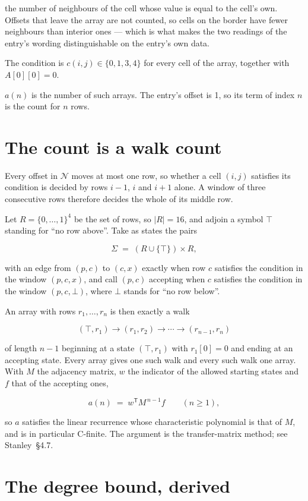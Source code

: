 \documentclass[11pt]{article}
\theoremstyle{definition}
\begin{document}
the number of neighbours of the cell whose value is equal to the cell's own. Offsets that leave the array are not counted, so cells on the border have fewer neighbours than interior ones --- which is what makes the two readings of the entry's wording distinguishable on the entry's own data.

The condition is $c(i,j) \in \{0, 1, 3, 4\}$ for every cell of the array, together with $A[0][0]=0$.

$a(n)$ is the number of such arrays. The entry's offset is 1, so its term of index $n$ is the count for $n$ rows.

\section{The count is a walk count}

Every offset in $\mathcal{N}$ moves at most one row, so whether a cell $(i,j)$ satisfies its condition is decided by rows $i-1$, $i$ and $i+1$ alone. A window of three consecutive rows therefore decides the whole of its middle row.

Let $R = \{0,\dots,1\}^{4}$ be the set of rows, so $|R| = 16$, and adjoin a symbol $\top$ standing for ``no row above''. Take as states the pairs

\[\Sigma \;=\; (R \cup \{\top\}) \times R,\]

with an edge from $(p,c)$ to $(c,x)$ exactly when row $c$ satisfies the condition in the window $(p,c,x)$, and call $(p,c)$ accepting when $c$ satisfies the condition in the window $(p,c,\bot)$, where $\bot$ stands for ``no row below''.

An array with rows $r_1,\dots,r_n$ is then exactly a walk

\[(\top,r_1) \to (r_1,r_2) \to \cdots \to (r_{n-1},r_n)\]

of length $n-1$ beginning at a state $(\top,r_1)$ with $r_1[0]=0$ and ending at an accepting state. Every array gives one such walk and every such walk one array. With $M$ the adjacency matrix, $w$ the indicator of the allowed starting states and $f$ that of the accepting ones,

\[a(n) \;=\; w^{\mathsf T} M^{\,n-1} f \qquad (n \ge 1),\]

so $a$ satisfies the linear recurrence whose characteristic polynomial is that of $M$, and is in particular C-finite. The argument is the transfer-matrix method; see Stanley~\S4.7.

\section{The degree bound, derived}
\end{document}
